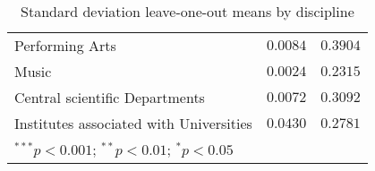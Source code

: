 \begin{table}[h]
\begin{center}
\begin{tabular}{l c c}
Performing Arts                             & $0.0084$ & $0.3904$ \\
Music                                       & $0.0024$ & $0.2315$ \\
Central scientific Departments              & $0.0072$ & $0.3092$ \\
Institutes associated with Universities     & $0.0430$ & $0.2781$ \\
\bottomrule
\multicolumn{3}{l}{\scriptsize{$^{***}p<0.001$; $^{**}p<0.01$; $^{*}p<0.05$}}
\end{tabular}
\caption{Standard deviation leave-one-out means by discipline}
\label{ table_sd_llo}
\end{center}
\end{table}
